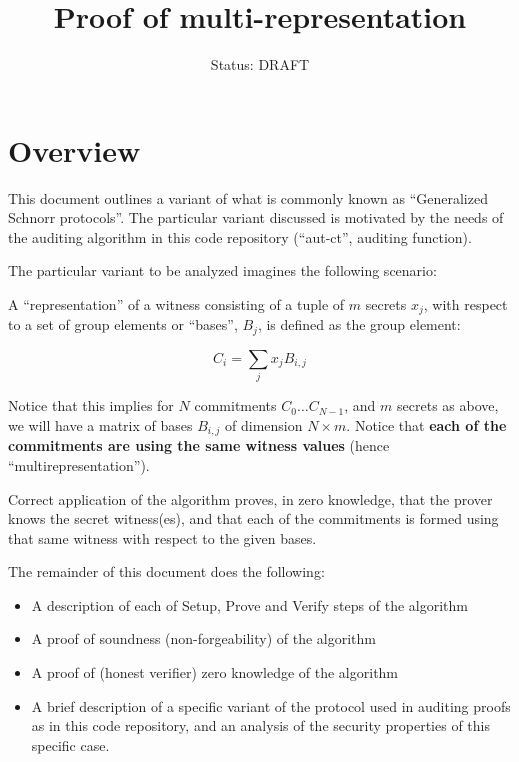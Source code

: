 \documentclass[10pt,a4paper]{article}
\author{Status: DRAFT}
\begin{document}
\title{Proof of multi-representation}
\maketitle


\section{Overview}

 This document outlines a variant of what is commonly known as ``Generalized Schnorr protocols''. The particular variant discussed is motivated by the needs of the auditing algorithm in this code repository (``aut-ct'', auditing function).

\vspace{5 pt}

 The particular variant to be analyzed imagines the following scenario:

\vspace{5 pt}

 A ``representation'' of a witness consisting of a tuple of $m$ secrets $x_j$, with respect to a set of group elements or ``bases'', $B_j$, is defined as the group element:

$$ C_i = \sum_j x_j B_{i,j}$$

 Notice that this implies for $N$ commitments $C_0 \ldots C_{N-1}$, and $m$ secrets as above, we will have a matrix of bases $B_{i,j}$ of dimension $N \times m$. Notice that \textbf{each of the commitments are using the same witness values} (hence ``multirepresentation'').

\vspace{5 pt}

Correct application of the algorithm proves, in zero knowledge, that the prover knows the secret witness(es), and that each of the commitments is formed using that same witness with respect to the given bases.

\vspace{5 pt}

The remainder of this document does the following:

\begin{itemize}
\item A description of each of Setup, Prove and Verify steps of the algorithm
\item A proof of soundness (non-forgeability) of the algorithm
\item A proof of (honest verifier) zero knowledge of the algorithm
\item A brief description of a specific variant of the protocol used in auditing proofs as in this code repository, and an analysis of the security properties of this specific case.
\end{itemize}
\end{document}

